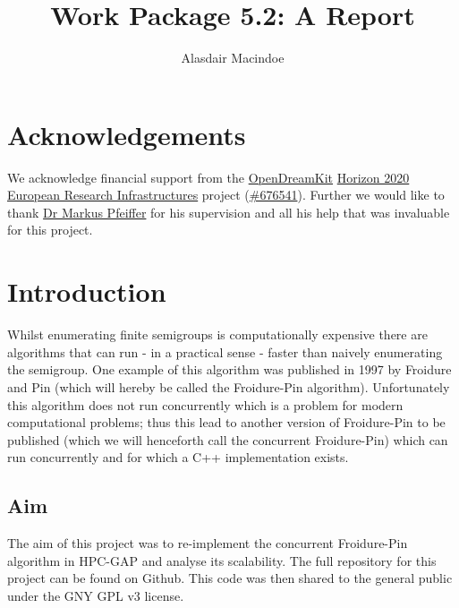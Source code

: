 \documentclass{report}
\author{Alasdair Macindoe}
\date{}
\title{Work Package 5.2: A Report}
\begin{document}
\maketitle

\section*{Acknowledgements}
We acknowledge financial support from the \href{http://opendreamkit.org/}{OpenDreamKit} \href{https://ec.europa.eu/programmes/horizon2020/}{Horizon 2020}
\href{https://ec.europa.eu/programmes/horizon2020/en/h2020-section/european-research-infrastructures-including-e-infrastructures}{European Research Infrastructures}
project (\href{http://cordis.europa.eu/project/rcn/198334_en.html}{\#676541}).
Further we would like to thank \href{https://www.cs.st-andrews.ac.uk/directory/person?id=mp397}{Dr Markus Pfeiffer} for his supervision and all his help
that was invaluable for this project.

\section*{Introduction}
Whilst enumerating finite semigroups is computationally expensive there are algorithms that can run - in a practical sense - faster than naively enumerating
the semigroup. One example of this algorithm was published in 1997 by Froidure and Pin\cite{fpin} (which will hereby be called the Froidure-Pin algorithm).
Unfortunately this algorithm does not run concurrently which is a problem for modern computational problems; thus this lead to another version of Froidure-Pin to be
published\cite{cfp} (which we will henceforth call the concurrent Froidure-Pin) which can run concurrently and for which a C++ implementation exists\cite{cfpcpp}.
\newline
\newline
\subsection*{Aim}
The aim of this project was to re-implement the concurrent Froidure-Pin algorithm in HPC-GAP\cite{GAP4} and analyse its scalability.
The full repository for this project can be found on Github\cite{project}. This code was then shared to the general public under
the GNY GPL v3 license.
\end{document}
